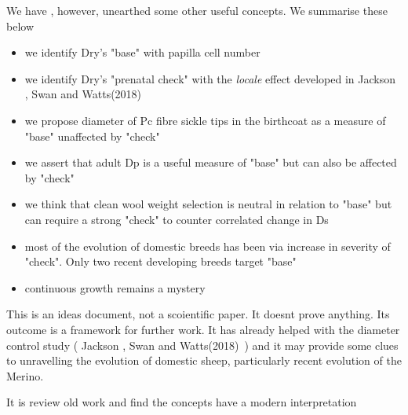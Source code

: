 \documentclass[titlepage]{article}  %
\begin{document}
We have , however, unearthed some other useful concepts. We summarise these below
\begin{itemize}
\item we identify Dry's "base" with papilla cell number
\item we identify Dry's "prenatal check" with the {\em locale} effect developed in Jackson , Swan and Watts(2018)~\cite{jackswan:18}
\item we propose diameter of Pc fibre sickle tips in the birthcoat as a measure of "base" unaffected by "check"
\item we assert that adult Dp is a useful measure of "base" but can also be affected by "check"
\item  we think that clean wool weight selection is neutral in relation to "base" but can require a strong "check" to counter correlated change in Ds
\item most of the evolution of domestic breeds has been via increase in severity of "check". Only two recent developing breeds target "base"
\item continuous growth remains a mystery
\end{itemize}

This is an ideas document, not a scoientific paper. It doesnt prove anything. Its outcome is a framework for further work.  It has already helped with the diameter control study ( Jackson , Swan and Watts(2018)~\cite{jackswan:18}) and it may provide some clues to unravelling the evolution of domestic sheep, particularly recent evolution of the Merino.

It is review old work and find the concepts have a modern interpretation
\end{document}
